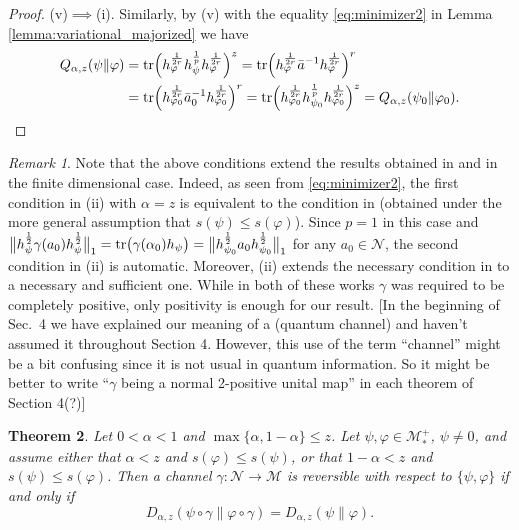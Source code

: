 \documentclass[12pt]{article}
\newtheorem{theorem}{Theorem}[section]
\theoremstyle{definition}
\theoremstyle{remark}
\newtheorem{remark}[theorem]{Remark}
\numberwithin{equation}{section}
\def\Me{\mathcal M}
\def\Ne{\mathcal N}
\def\Tr{\mathrm{tr}}
\def\ffi{\varphi}
\begin{document}
\begin{proof}
(v)$\implies$(i).\enspace
Similarly, by (v) with the equality \eqref{eq:minimizer2} in Lemma
\ref{lemma:variational_majorized} we have
\begin{align*}
Q_{\alpha,z}(\psi\|\ffi)
&=\Tr\Bigl(h_\ffi^{1\over2r}h_\psi^{1\over p}h_\ffi^{1\over2r}\Bigr)^z
=\Tr\Bigl(h_\ffi^{1\over2r}\bar a^{-1}h_\ffi^{1\over2r}\Bigr)^{r} \\
&=\Tr\Bigl(h_{\ffi_0}^{1\over2r}\bar a_0^{-1}h_{\ffi_0}^{1\over2r}\Bigr)^{r}
=\Tr\Bigl(h_{\ffi_0}^{1\over2r}h_{\psi_0}^{1\over p}h_{\ffi_0}^{1\over2r}\Bigr)^z
=Q_{\alpha,z}(\psi_0\|\ffi_0).
\end{align*}
\end{proof}


\begin{remark}\label{rem:conditions} Note that the above conditions extend the results
obtained in \cite{leditzky2017data} and \cite{zhang2020equality} in the finite dimensional case.
Indeed, as seen from \eqref{eq:minimizer2}, the first condition in (ii) with $\alpha=z$ is 
equivalent to the condition in \cite[Theorem 1]{leditzky2017data} (obtained under the more
general assumption that $s(\psi)\le s(\ffi)$). Since $p=1$ in this case and 
$\big\|h_\psi^{1\over2}\gamma(a_0)h_\psi^{1\over2}\big\|_{1}=\Tr
\bigl(\gamma(\alpha_0)h_\psi\bigr)=\big\|h_{\psi_0}^{1\over2}a_0h_{\psi_0}^{1\over2}\big\|_{1}$
for any $a_0\in \Ne$, the second condition in (ii) is automatic.
Moreover, (ii) extends the necessary condition in \cite[Theorem 1.2(2)]{zhang2020equality}
to a necessary and sufficient one. While in both of these works $\gamma$ was required
to be completely positive, only positivity is enough for our result.
{\color{blue}[In the beginning of Sec.~4 we have explained our meaning of a (quantum channel) and
haven't assumed it throughout Section 4. However, this use of the term ``channel'' might be a bit confusing
since it is not usual in quantum information. So it might be better to write ``$\gamma$ being a normal
2-positive unital map'' in each theorem of Section 4(?)]}
\end{remark}


\begin{theorem}\label{thm:suffle1} Let $0<\alpha<1$ and $\max\{\alpha,1-\alpha\}\le
z$. Let $\psi,\varphi\in \Me_*^+$, $\psi\ne0$, and assume either that $\alpha<z$ and $s(\ffi)\le
s(\psi)$, or that $1-\alpha<z$ and $s(\psi)\le s(\ffi)$. 
Then a channel $\gamma:\Ne \to \Me$ is reversible with respect to
$\{\psi,\varphi\}$ if and only if
\[
D_{\alpha,z}(\psi\circ\gamma\|\varphi\circ\gamma)=D_{\alpha,z}(\psi\|\varphi).
\]
\end{theorem}
\end{document}
